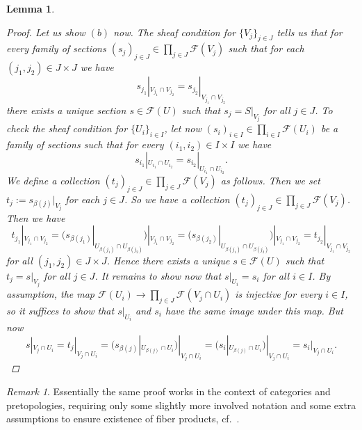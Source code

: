 \documentclass[12pt,reqno,a4paper]{amsart}
\theoremstyle{plain}
\newtheorem{lm}[thm]{Lemma}
\theoremstyle{definition}
\theoremstyle{remark}
\newtheorem{rem}[thm]{Remark}
\begin{document}
\begin{lm}
\begin{proof}
    Let us show $(b)$ now.
    The sheaf condition for $\{ V_{j} \}_{j \in J}$ tells us that for every family of sections $(s_{j})_{j \in J} \in \prod_{j \in J} \mathscr{F}(V_{j})$ such that for each $(j_{1},j_{2}) \in J \times J$ we have
    \[ s_{j_{1}}|_{V_{j_{1}} \cap V_{j_{2}}} = s_{j_{2}}|_{V_{j_{1}} \cap V_{j_{2}}} \]
    there exists a unique section $s \in \mathscr{F}(U)$ such that $s_{j} = S|_{V_{j}}$ for all $j \in J$.
    To check the sheaf condition for $\{ U_{i} \}_{i \in I}$, let now $(s_{i})_{i \in I} \in \prod_{i \in I}\mathscr{F}(U_{i})$ be a family of sections such that for every $(i_{1}, i_{2}) \in I \times I$ we have
    \[ s_{i_{1}}|_{U_{i_{1}} \cap U_{i_{2}}} = s_{i_{2}}|_{U_{i_{1}} \cap U_{i_{2}}}. \]
    We define a collection $(t_{j})_{j \in J} \in \prod_{j \in J} \mathscr{F}(V_{j})$ as follows.
    Then we set $t_{j} := s_{\beta(j)}|_{V_{j}}$ for each $j \in J$.
    So we have a collection $(t_{j})_{j \in J} \in \prod_{j \in J} \mathscr{F}(V_{j})$.
    Then we have
    \[ t_{j_{1}}|_{V_{j_{1}} \cap V_{j_{2}}} = (s_{\beta(j_{1})}|_{U_{\beta(j_{1})} \cap U_{\beta(j_{2})}})|_{V_{j_{1}} \cap V_{j_{2}}} = (s_{\beta(j_{2})}|_{U_{\beta(j_{1})} \cap U_{\beta(j_{2})}})|_{V_{j_{1}} \cap V_{j_{2}}} = t_{j_{2}}|_{V_{j_{1}} \cap V_{j_{2}}} \]
    for all $(j_{1}, j_{2}) \in J \times J$.
    Hence there exists a unique $s \in \mathscr{F}(U)$ such that $t_{j} = s|_{V_{j}}$ for all $j \in J$.
    It remains to show now that $s|_{U_{i}} = s_{i}$ for all $i \in I$.
    By assumption, the map $\mathscr{F}(U_{i}) \to \prod_{j \in J} \mathscr{F}(V_{j} \cap U_{i})$ is injective for every $i \in I$, so it suffices to show that $s|_{U_{i}}$ and $s_{i}$ have the same image under this map.
    But now
    \[ s|_{V_{j} \cap U_{i}} = t_{j}|_{V_{j} \cap U_{i}} = (s_{\beta(j)}|_{U_{\beta(j)} \cap U_{i}})|_{V_{j} \cap U_{i}} = (s_{i}|_{U_{\beta(j)} \cap U_{i}})|_{V_{j} \cap U_{i}} = s_{i}|_{V_{j} \cap U_{i}}. \]
  \end{proof}
\end{lm}

\begin{rem}
  Essentially the same proof works in the context of categories and pretopologies, requiring only some slightly more involved notation and some extra assumptions to ensure existence of fiber products, cf.~\cite[\href{https://stacks.math.columbia.edu/tag/0G1L}{Tag 0G1L}]{stacks-project}.
\end{rem}
\end{document}

